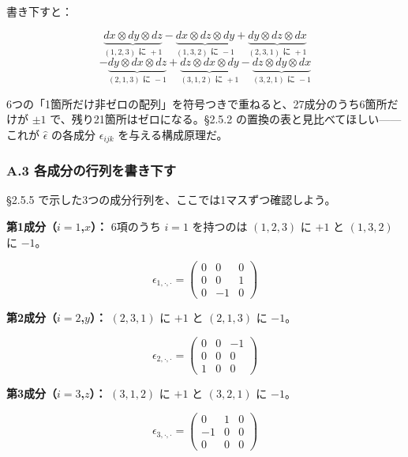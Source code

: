 \documentclass[a4paper,12pt,openany]{book}
\begin{document}
書き下すと：

\[\underbrace{dx \otimes dy \otimes dz}_{(1,2,3)\text{ に }+1} - \underbrace{dx \otimes dz \otimes dy}_{(1,3,2)\text{ に }-1} + \underbrace{dy \otimes dz \otimes dx}_{(2,3,1)\text{ に }+1}\]
\[- \underbrace{dy \otimes dx \otimes dz}_{(2,1,3)\text{ に }-1} + \underbrace{dz \otimes dx \otimes dy}_{(3,1,2)\text{ に }+1} - \underbrace{dz \otimes dy \otimes dx}_{(3,2,1)\text{ に }-1}\]

6つの「1箇所だけ非ゼロの配列」を符号つきで重ねると、27成分のうち6箇所だけが
\(\pm 1\) で、残り21箇所はゼロになる。§2.5.2
の置換の表と見比べてほしい——これが \(\widehat{\epsilon}\) の各成分
\(\epsilon_{ijk}\) を与える構成原理だ。

\hypertarget{a.3-ux5404ux6210ux5206ux306eux884cux5217ux3092ux66f8ux304dux4e0bux3059}{%
\subsubsection*{A.3
各成分の行列を書き下す}\label{a.3-ux5404ux6210ux5206ux306eux884cux5217ux3092ux66f8ux304dux4e0bux3059}}

§2.5.5 で示した3つの成分行列を、ここでは1マスずつ確認しよう。

\textbf{第1成分（}\(i = 1\)\textbf{,}\(x\)\textbf{）：} 6項のうち
\(i = 1\) を持つのは \((1,2,3)\) に \(+1\) と \((1,3,2)\) に \(-1\)。

\[\epsilon_{1,\cdot,\cdot} = \begin{pmatrix} 0 & 0 & 0 \\ 0 & 0 & 1 \\ 0 & -1 & 0 \end{pmatrix}\]

\textbf{第2成分（}\(i = 2\)\textbf{,}\(y\)\textbf{）：} \((2,3,1)\) に
\(+1\) と \((2,1,3)\) に \(-1\)。

\[\epsilon_{2,\cdot,\cdot} = \begin{pmatrix} 0 & 0 & -1 \\ 0 & 0 & 0 \\ 1 & 0 & 0 \end{pmatrix}\]

\textbf{第3成分（}\(i = 3\)\textbf{,}\(z\)\textbf{）：} \((3,1,2)\) に
\(+1\) と \((3,2,1)\) に \(-1\)。

\[\epsilon_{3,\cdot,\cdot} = \begin{pmatrix} 0 & 1 & 0 \\ -1 & 0 & 0 \\ 0 & 0 & 0 \end{pmatrix}\]
\end{document}

